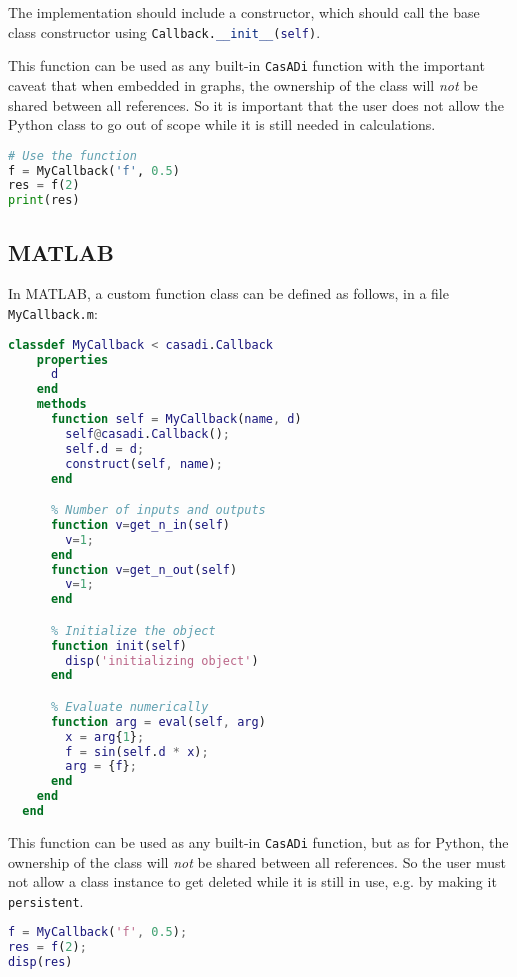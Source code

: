 \documentclass[a4paper,12pt]{book}
\newcommand{\CasADi}{\texttt{CasADi}\xspace}
\begin{document}
The implementation should include a constructor, which should call the
base class constructor using
\lstinline[language=Python]{Callback.__init__(self)}.

This function can be used as any built-in \CasADi function with the important
caveat that when embedded in graphs, the ownership of the class will \emph{not}
be shared between all references. So it is important that the user does not
allow the Python class to go out of scope while it is still needed in
calculations.

\begin{lstlisting}[language=Python]
# Use the function
f = MyCallback('f', 0.5)
res = f(2)
print(res)
\end{lstlisting}

\subsection*{MATLAB}
In MATLAB, a custom function class can be defined as follows, in a file
\verb|MyCallback.m|:

\begin{lstlisting}[language=Matlab]
  classdef MyCallback < casadi.Callback
    properties
      d
    end
    methods
      function self = MyCallback(name, d)
        self@casadi.Callback();
        self.d = d;
        construct(self, name);
      end

      % Number of inputs and outputs
      function v=get_n_in(self)
        v=1;
      end
      function v=get_n_out(self)
        v=1;
      end

      % Initialize the object
      function init(self)
        disp('initializing object')
      end

      % Evaluate numerically
      function arg = eval(self, arg)
        x = arg{1};
        f = sin(self.d * x);
        arg = {f};
      end
    end
  end
\end{lstlisting}

This function can be used as any built-in \CasADi function, but as for Python,
the ownership of the class will \emph{not} be shared between all references.
So the user must not allow a class instance to get deleted while it is still
in use, e.g. by making it \texttt{persistent}.

\begin{lstlisting}[language=Matlab]
% Use the function
f = MyCallback('f', 0.5);
res = f(2);
disp(res)
\end{lstlisting}
\end{document}
